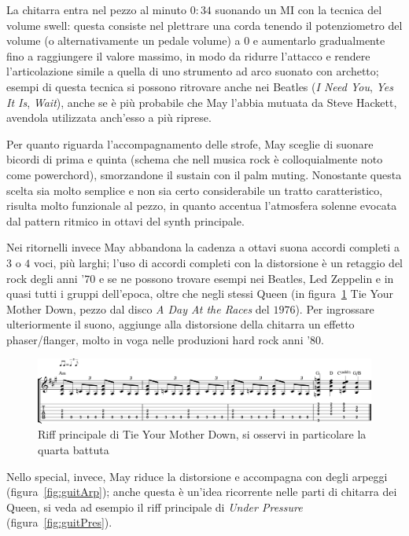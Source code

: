 \documentclass[12pt]{article}
\begin{document}
La chitarra entra nel pezzo al minuto \(0:34\) suonando un MI con la tecnica del volume swell: questa consiste nel plettrare una corda tenendo il potenziometro del volume (o alternativamente un pedale volume) a \(0\) e aumentarlo gradualmente fino a raggiungere il valore massimo, in modo da ridurre l'attacco e rendere l'articolazione simile a quella di uno strumento ad arco suonato con archetto; esempi di questa tecnica si possono ritrovare anche nei Beatles (\emph{I Need You}, \emph{Yes It Is}, \emph{Wait}), anche se è più probabile che May l'abbia mutuata da Steve Hackett, avendola utilizzata anch'esso a più riprese.

Per quanto riguarda l'accompagnamento delle strofe, May sceglie di suonare bicordi di prima e quinta (schema che nell musica rock è colloquialmente noto come powerchord), smorzandone il sustain con il palm muting. Nonostante questa scelta sia molto semplice e non sia certo considerabile un tratto caratteristico, risulta molto funzionale al pezzo, in quanto accentua l'atmosfera solenne evocata dal pattern ritmico in ottavi del synth principale.

Nei ritornelli invece May abbandona la cadenza a ottavi suona accordi completi a \(3\) o \(4\) voci, più larghi; l'uso di accordi completi con la distorsione è un retaggio del rock degli anni '\(70\) e se ne possono trovare esempi nei Beatles, Led Zeppelin e in quasi tutti i gruppi dell'epoca, oltre che negli stessi Queen (in figura~\ref{fig:mother} Tie Your Mother Down, pezzo dal disco \emph{A Day At the Races} del \(1976\)). Per ingrossare ulteriormente il suono, aggiunge alla distorsione della chitarra un effetto phaser/flanger, molto in voga nelle produzioni hard rock anni '\(80\).

\begin{figure}[H]
 \centering
 \includegraphics[width=\textwidth,keepaspectratio]{guitars/mother}
 \caption{Riff principale di Tie Your Mother Down, si osservi in particolare la quarta battuta}
 \label{fig:mother}
\end{figure}

Nello special, invece, May riduce la distorsione e accompagna con degli arpeggi (figura~\ref{fig:guitArp}); anche questa è un'idea ricorrente nelle parti di chitarra dei Queen, si veda ad esempio il riff principale di \emph{Under Pressure} (figura~\ref{fig:guitPres}).
\end{document}

